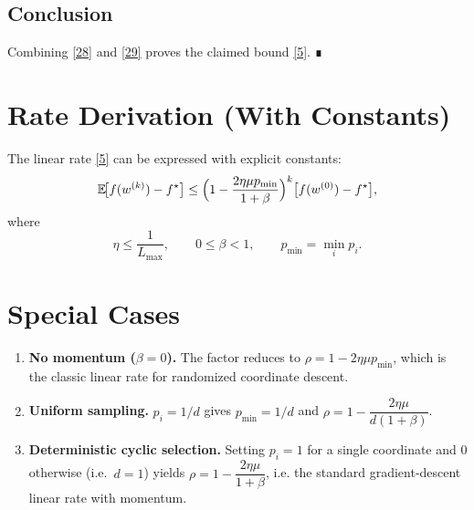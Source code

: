 \documentclass{article}
\newcommand{\E}{\mathbb{E}}
\begin{document}
\subsection*{Conclusion}
Combining \eqref{28} and \eqref{29} proves the claimed bound \eqref{5}.  ∎

\section*{Rate Derivation (With Constants)}
The linear rate \eqref{5} can be expressed with explicit constants:
\[
    \E\!\bigl[f(w^{(k)})-f^{\star}\bigr]
    \le
    \Bigl(1-\frac{2\eta\mu p_{\min}}{1+\beta}\Bigr)^{k}
    \bigl[f(w^{(0)})-f^{\star}\bigr],
\]
where
\[
    \eta\le\frac{1}{L_{\max}},\qquad
    0\le\beta<1,\qquad
    p_{\min}=\min_{i}p_i.
\]

\section*{Special Cases}
\begin{enumerate}[label=\alph*)]
\item \textbf{No momentum ($\beta=0$).} The factor reduces to
      $\rho=1-2\eta\mu p_{\min}$, which is the classic linear rate for
      randomized coordinate descent.
\item \textbf{Uniform sampling.} $p_i=1/d$ gives $p_{\min}=1/d$ and
      $\rho=1-\dfrac{2\eta\mu}{d(1+\beta)}$.
\item \textbf{Deterministic cyclic selection.}  
      Setting $p_i=1$ for a single coordinate and $0$ otherwise
      (i.e.\ $d=1$) yields $\rho=1-\dfrac{2\eta\mu}{1+\beta}$,
      i.e. the standard gradient‑descent linear rate with momentum.
\end{enumerate}
\end{document}
